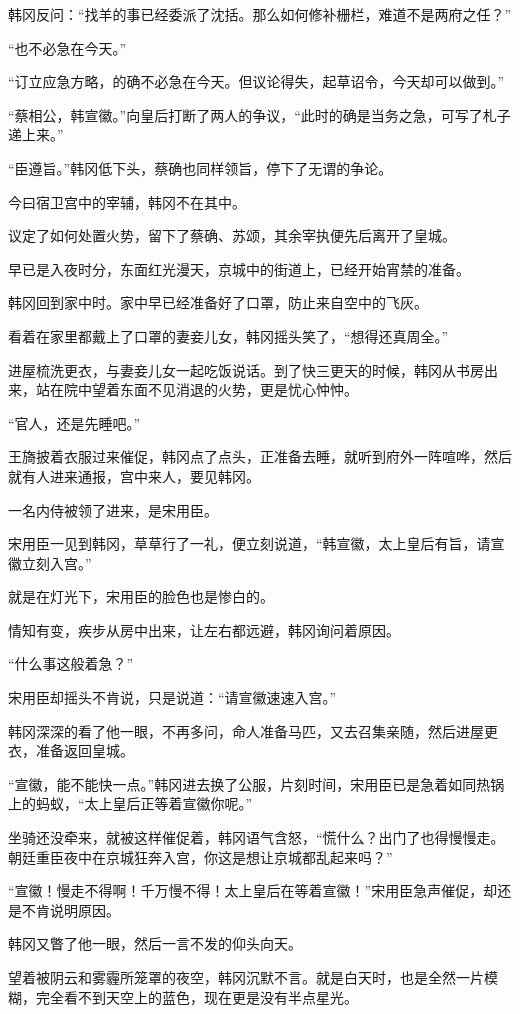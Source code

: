 韩冈反问：“找羊的事已经委派了沈括。那么如何修补栅栏，难道不是两府之任？”

“也不必急在今天。”

“订立应急方略，的确不必急在今天。但议论得失，起草诏令，今天却可以做到。”

“蔡相公，韩宣徽。”向皇后打断了两人的争议，“此时的确是当务之急，可写了札子递上来。”

“臣遵旨。”韩冈低下头，蔡确也同样领旨，停下了无谓的争论。

今曰宿卫宫中的宰辅，韩冈不在其中。

议定了如何处置火势，留下了蔡确、苏颂，其余宰执便先后离开了皇城。

早已是入夜时分，东面红光漫天，京城中的街道上，已经开始宵禁的准备。

韩冈回到家中时。家中早已经准备好了口罩，防止来自空中的飞灰。

看着在家里都戴上了口罩的妻妾儿女，韩冈摇头笑了，“想得还真周全。”

进屋梳洗更衣，与妻妾儿女一起吃饭说话。到了快三更天的时候，韩冈从书房出来，站在院中望着东面不见消退的火势，更是忧心忡忡。

“官人，还是先睡吧。”

王旖披着衣服过来催促，韩冈点了点头，正准备去睡，就听到府外一阵喧哗，然后就有人进来通报，宫中来人，要见韩冈。

一名内侍被领了进来，是宋用臣。

宋用臣一见到韩冈，草草行了一礼，便立刻说道，“韩宣徽，太上皇后有旨，请宣徽立刻入宫。”

就是在灯光下，宋用臣的脸色也是惨白的。

情知有变，疾步从房中出来，让左右都远避，韩冈询问着原因。

“什么事这般着急？”

宋用臣却摇头不肯说，只是说道：“请宣徽速速入宫。”

韩冈深深的看了他一眼，不再多问，命人准备马匹，又去召集亲随，然后进屋更衣，准备返回皇城。

“宣徽，能不能快一点。”韩冈进去换了公服，片刻时间，宋用臣已是急着如同热锅上的蚂蚁，“太上皇后正等着宣徽你呢。”

坐骑还没牵来，就被这样催促着，韩冈语气含怒，“慌什么？出门了也得慢慢走。朝廷重臣夜中在京城狂奔入宫，你这是想让京城都乱起来吗？”

“宣徽！慢走不得啊！千万慢不得！太上皇后在等着宣徽！”宋用臣急声催促，却还是不肯说明原因。

韩冈又瞥了他一眼，然后一言不发的仰头向天。

望着被阴云和雾霾所笼罩的夜空，韩冈沉默不言。就是白天时，也是全然一片模糊，完全看不到天空上的蓝色，现在更是没有半点星光。

